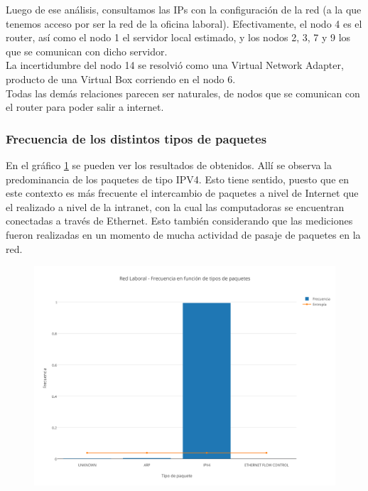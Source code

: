 Luego de ese an\'alisis, consultamos las IPs con la configuraci\'on de la red (a la que tenemos acceso por ser la red de la oficina laboral). Efectivamente, el nodo 4 es el router, as\'i como el nodo 1 el servidor local estimado, y los nodos 2, 3, 7 y 9 los que se comunican con dicho servidor.\\

La incertidumbre del nodo 14 se resolvi\'o como una Virtual Network Adapter, producto de una Virtual Box corriendo en el nodo 6.\\

Todas las dem\'as relaciones parecen ser naturales, de nodos que se comunican con el router para poder salir a internet.\\

\subsubsection{Frecuencia de los distintos tipos de paquetes}

En el gr\'afico \ref{laboralPaquetes} se pueden ver los resultados de obtenidos. All\'i se observa la predominancia de los paquetes de tipo IPV4. Esto tiene sentido, puesto que en este contexto es m\'as frecuente el intercambio de paquetes a nivel de Internet que el realizado a nivel de la intranet, con la cual las computadoras se encuentran conectadas a trav\'es de Ethernet. Esto tambi\'en considerando que las mediciones fueron realizadas en un momento de mucha actividad de pasaje de paquetes en la red.\\

\begin{figure}[h!]
    \centering                                                       
    \includegraphics[width=400pt]{img/LaboralFrecuenciaVsTipoPaquetes}
    \caption{}
    \label{laboralPaquetes}
\end{figure}

